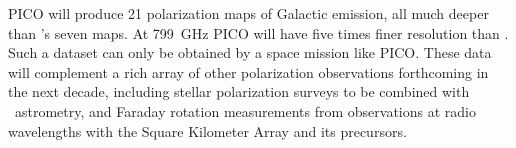 \documentclass[PICOAPC.tex]{subfiles}
\begin{document}
PICO will produce 21 polarization maps of Galactic emission, all much deeper than \planck 's seven maps. At 799~GHz PICO will have five times finer resolution than \planck . %
Such a dataset can only be obtained by a space mission like PICO. These data will complement a rich array of other polarization observations forthcoming in the next decade, including stellar polarization surveys to be combined with \gaia~astrometry, and Faraday rotation measurements from  observations at radio wavelengths with the  Square Kilometer Array and its precursors. \\
%
%
\end{document}
